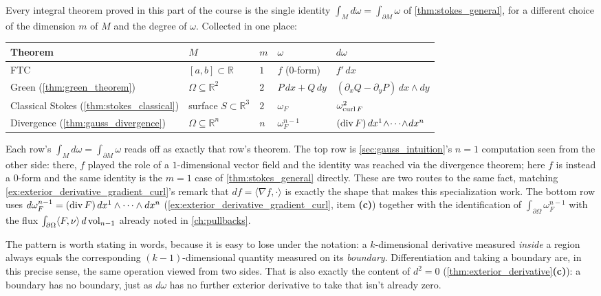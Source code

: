 \begin{remark}
\label{rem:one_theorem_four_costumes}
Every integral theorem proved in this part of the course is the single identity
$\int_M d\omega = \int_{\partial M}\omega$ of \cref{thm:stokes_general}, for a different choice
of the dimension $m$ of $M$ and the degree of $\omega$. Collected in one place:
\begin{center}
\small
\begin{tabular}{@{}lllll@{}}
\toprule
\textbf{Theorem} & $M$ & $m$ & $\omega$ & $d\omega$ \\
\midrule
FTC &
  $[a,b]\subset\mathbb{R}$ & $1$ & $f$ ($0$-form) & $f'\,dx$ \\
Green (\cref{thm:green_theorem}) &
  $\Omega\subseteq\mathbb{R}^2$ & $2$ & $P\,dx+Q\,dy$ & $(\partial_xQ{-}\partial_yP)\,dx\!\wedge\! dy$ \\
Classical Stokes (\cref{thm:stokes_classical}) &
  surface $S\subset\mathbb{R}^3$ & $2$ & $\omega_F$ & $\omega_{\operatorname{curl} F}^2$ \\
Divergence (\cref{thm:gauss_divergence}) &
  $\Omega\subseteq\mathbb{R}^n$ & $n$ & $\omega_F^{n-1}$ & $(\operatorname{div} F)\,dx^1\!\wedge\!\cdots\!\wedge\! dx^n$ \\
\bottomrule
\end{tabular}
\end{center}
Each row's $\int_M d\omega = \int_{\partial M}\omega$ reads off as exactly that row's theorem.
The top row is \cref{sec:gauss_intuition}'s $n=1$ computation seen from the other side: there,
$f$ played the role of a $1$-dimensional vector field and the identity was reached via the
divergence theorem; here $f$ is instead a $0$-form and the same identity is the $m=1$ case of
\cref{thm:stokes_general} directly. These are two routes to the same fact, matching
\cref{ex:exterior_derivative_gradient_curl}'s remark that $df = \langle\nabla f,\cdot\rangle$ is
exactly the shape that makes this specialization work. The bottom row uses
$d\omega_F^{n-1} = (\operatorname{div} F)\,dx^1\wedge\cdots\wedge dx^n$
(\cref{ex:exterior_derivative_gradient_curl}, item \textbf{(c)}) together with the identification
of
$\int_{\partial\Omega}\omega_F^{n-1}$ with the flux $\int_{\partial\Omega}\langle
F,\nu\rangle\,d\operatorname{vol}_{n-1}$ already noted in \cref{ch:pullbacks}.

The pattern is worth stating in words, because it is easy to lose under the notation: a
$k$-dimensional derivative measured \emph{inside} a region always equals the corresponding
$(k{-}1)$-dimensional quantity measured on its \emph{boundary}. Differentiation and taking a
boundary are, in this precise sense, the same operation viewed from two sides. That is also
exactly the content of $d^2=0$ (\cref{thm:exterior_derivative}\textbf{(c)}): a boundary has no
boundary, just as $d\omega$ has no further exterior derivative to take that isn't already zero.
\end{remark}

